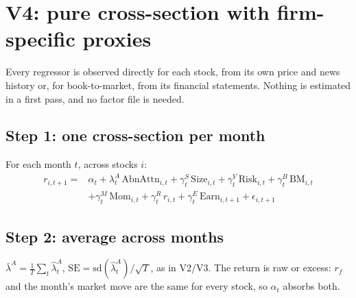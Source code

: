 \documentclass[11pt]{article}
\begin{document}
\section{V4: pure cross-section with firm-specific proxies}\label{sec:v4}

Every regressor is observed directly for each stock, from its own price and news history or, for book-to-market, from its financial statements. Nothing is estimated in a first pass, and no factor file is needed.

\subsection*{Step 1: one cross-section per month}
For each month $t$, across stocks $i$:
\begin{align*}
r_{i,t+1} = {}& \alpha_t + \lambda^{A}_t\,\text{AbnAttn}_{i,t} + \gamma^{S}_t\,\text{Size}_{i,t} + \gamma^{V}_t\,\text{Risk}_{i,t} + \gamma^{B}_t\,\text{BM}_{i,t}\\
&+ \gamma^{M}_t\,\text{Mom}_{i,t} + \gamma^{R}_t\,r_{i,t} + \gamma^{E}_t\,\text{Earn}_{i,t+1} + \epsilon_{i,t+1}
\end{align*}

\subsection*{Step 2: average across months}
$\bar\lambda^{A} = \frac{1}{T}\sum_t \hat\lambda^{A}_t$, $\text{SE} = \text{sd}(\hat\lambda^{A}_t)/\sqrt{T}$, as in V2/V3. The return is raw or excess: $r_f$ and the month's market move are the same for every stock, so $\alpha_t$ absorbs both.
\end{document}
